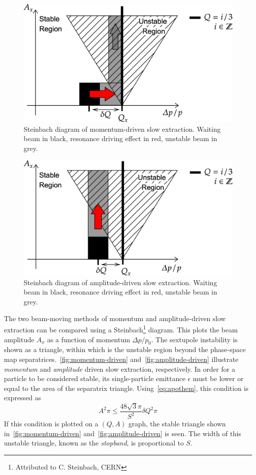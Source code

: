 \documentclass[a4paper,twoside,11pt]{report}
\begin{document}
\begin{figure}[ht]
  \centering
  \includegraphics[width=0.6\linewidth]{momentum-driven.png}
  \caption[Steinbach diagram of momentum-driven slow extraction]{Steinbach diagram of momentum-driven slow extraction. Waiting beam in black, resonance driving effect in red, unstable beam in grey.}\label{fig:momentum-driven}
\end{figure}

\begin{figure}[ht]
  \centering
  \includegraphics[width=0.6\linewidth]{amplitude-driven.png}
  \caption[Steinbach diagram of amplitude-driven slow extraction]{Steinbach diagram of amplitude-driven slow extraction. Waiting beam in black, resonance driving effect in red, unstable beam in grey.}\label{fig:amplitude-driven}
\end{figure}

The two beam-moving methods of momentum and amplitude-driven slow extraction can be compared using a Steinbach\footnote{Attributed to C. Steinbach, CERN} diagram. This plots the beam amplitude $A_x$ as a function of momentum $\Delta p/p_0$. The sextupole instability is shown as a triangle, within which is the unstable region beyond the phase-space map separatrices.~\autoref{fig:momentum-driven} and~\autoref{fig:amplitude-driven} illustrate \textit{momentum} and \textit{amplitude} driven slow extraction, respectively.
In order for a particle to be considered stable, its single-particle emittance $\epsilon$ must be lower or equal to the area of the separatrix triangle. Using~\autoref{eq:apothem}, this condition is expressed as
\begin{equation}
  A^2\pi\le\frac{48\sqrt 3\pi}{S^2}\delta Q^2\pi
  \label{eq:steinbach}
\end{equation} 
If this condition is plotted on a $(Q, A)$ graph, the stable triangle shown in~\autoref{fig:momentum-driven} and~\autoref{fig:amplitude-driven} is seen. The width of this unstable triangle, known as the \textit{stopband}, is proportional to $S$.
\end{document}
